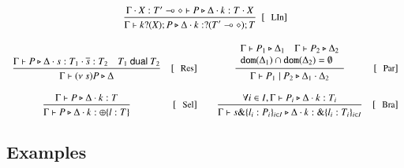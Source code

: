 \[\begin{array}{crccr}
	\multicolumn{5}{c}{
		\tree{
			\tprocess{\Gamma \cat \X: \lhot{T'}}{P}{\Delta \cat k: T \cat X}
		}{
			\tprocess{\Gamma}{\binp{k}{\X} P}{\Delta \cat k: \btinp{\lhot{T'}} T}
		}\ \ \trule{LIn}
	}
	\\[7mm]


	\tree{
		\Gtprocess{P}{\Delta \cat s:T_1 \cat \dual{s}:T_2} \quad T_1 \dualof T_2
	}{
		\Gtprocess{\news{s} P}{\Delta}
	} & \trule{Res}
	& &
	\tree{
		\begin{array}{l}
			\Gtprocess{P_1}{\Delta_1} \quad \Gtprocess{P_2}{\Delta_2} \\
			\dom{\Delta_1} \cap \dom{\Delta_2} = \es
		\end{array}
	}{
		\Gtprocess{P_1 \Par P_2}{\Delta_1 \cat \Delta_2}
	} & \trule{Par}
	\\[7mm]

	\tree{
		\Gtprocess{P}{\Delta \cat k: T}
	}{
		\Gtprocess{P}{\Delta \cat k: \btsel{l:T}}
	} & \trule{Sel}
	& &
	\tree{
		\forall i \in I, \Gtprocess{P_i}{\Delta \cat k: T_i}
	}{
		\Gtprocess{\bbra{s}{l_i:P_i}_{i \in I}}{\Delta \cat k: \btbra{l_i:T_i}_{i \in I}}
	} & \trule{Bra}
\end{array}
\]

\subsection{Examples}

